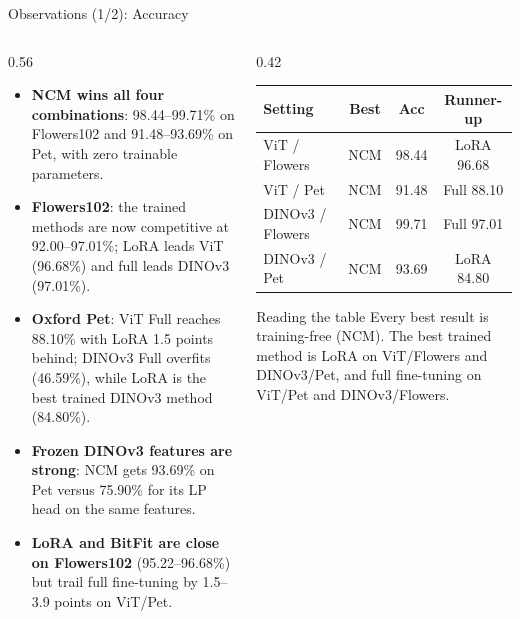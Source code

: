 \documentclass[10pt, aspectratio=169]{beamer}
\begin{document}
\begin{frame}[t]{Observations (1/2): Accuracy}
  \begin{columns}[T]
    \begin{column}{0.56\textwidth}
      \small
      \begin{itemize}
        \item \textbf{NCM wins all four combinations}: 98.44--99.71\% on Flowers102 and 91.48--93.69\% on Pet, with zero trainable parameters.
        \item \textbf{Flowers102}: the trained methods are now competitive at 92.00--97.01\%; LoRA leads ViT (96.68\%) and full leads DINOv3 (97.01\%).
        \item \textbf{Oxford Pet}: ViT Full reaches 88.10\% with LoRA 1.5 points behind; DINOv3 Full overfits (46.59\%), while LoRA is the best trained DINOv3 method (84.80\%).
        \item \textbf{Frozen DINOv3 features are strong}: NCM gets 93.69\% on Pet versus 75.90\% for its LP head on the same features.
        \item \textbf{LoRA and BitFit are close on Flowers102} (95.22--96.68\%) but trail full fine-tuning by 1.5--3.9 points on ViT/Pet.
      \end{itemize}
    \end{column}
    \begin{column}{0.42\textwidth}
      \centering
      \scriptsize
      \setlength{\tabcolsep}{3pt}
      \begin{tabular}{lccc}
        \toprule
        Setting & Best & Acc & Runner-up \\
        \midrule
        ViT / Flowers & NCM & 98.44 & LoRA 96.68 \\
        ViT / Pet & NCM & 91.48 & Full 88.10 \\
        DINOv3 / Flowers & NCM & 99.71 & Full 97.01 \\
        DINOv3 / Pet & NCM & 93.69 & LoRA 84.80 \\
        \bottomrule
      \end{tabular}

      \vspace{0.25cm}
      \begin{block}{Reading the table}
        \footnotesize
        Every best result is training-free (NCM). The best trained method is LoRA on ViT/Flowers and DINOv3/Pet, and full fine-tuning on ViT/Pet and DINOv3/Flowers.
      \end{block}
    \end{column}
  \end{columns}
\end{frame}
\end{document}
